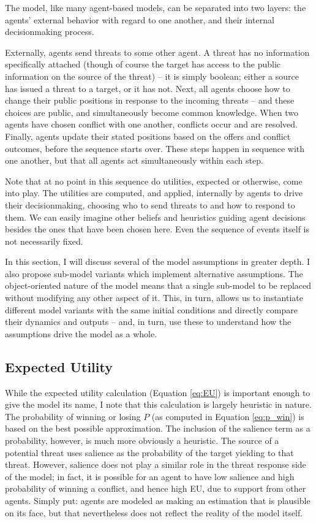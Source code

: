 The model, like many agent-based models, can be separated into two layers: the agents' external behavior with regard to one another, and their internal decisionmaking process. 

Externally, agents send threats to some other agent. A threat has no information specifically attached (though of course the target has access to the public information on the source of the threat) -- it is simply boolean; either a source has issued a threat to a target, or it has not. Next, all agents choose how to change their public positions in response to the incoming threats -- and these choices are public, and simultaneously become common knowledge. When two agents have chosen conflict with one another, conflicts occur and are resolved. Finally, agents update their stated positions based on the offers and conflict outcomes, before the sequence starts over. These steps happen in sequence with one another, but that all agents act simultaneously within each step.

Note that at no point in this sequence do utilities, expected or otherwise, come into play. The utilities are computed, and applied, internally by agents to drive their decisionmaking, choosing who to send threats to and how to respond to them. We can easily imagine other beliefs and heuristics guiding agent decisions besides the ones that have been chosen here. Even the sequence of events itself is not necessarily fixed.

In this section, I will discuss several of the model assumptions in greater depth. I also propose sub-model variants which implement alternative assumptions. The object-oriented nature of the model means that a single sub-model to be replaced without modifying any other aspect of it. This, in turn, allows us to instantiate different model variants with the same initial conditions and directly compare their dynamics and outputs -- and, in turn, use these to understand how the assumptions drive the model as a whole.

\subsection{Expected Utility}

While the expected utility calculation (Equation \ref{eq:EU}) is important enough to give the model its name, I note that this calculation is largely heuristic in nature. The probability of winning or losing $P$ (as computed in Equation \ref{eq:p_win}) is based on the best possible approximation. The inclusion of the salience term as a probability, however, is much more obviously a heuristic. The source of a potential threat uses salience as the probability of the target yielding to that threat. However, salience does not play a similar role in the threat response side of the model; in fact, it is possible for an agent to have low salience and high probability of winning a conflict, and hence high EU, due to support from other agents. Simply put: agents are modeled as making an estimation that is plausible on its face, but that nevertheless does not reflect the reality of the model itself. 

